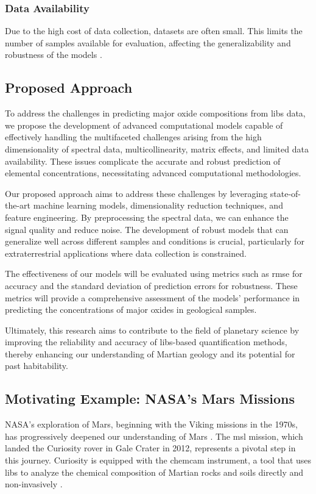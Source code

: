 \subsubsection{Data Availability}
Due to the high cost of data collection, datasets are often small. This limits the number of samples available for evaluation, affecting the generalizability and robustness of the models \cite{p9_paper}.

\subsection{Proposed Approach}
To address the challenges in predicting major oxide compositions from \gls{libs} data, we propose the development of advanced computational models capable of effectively handling the multifaceted challenges arising from the high dimensionality of spectral data, multicollinearity, matrix effects, and limited data availability.
These issues complicate the accurate and robust prediction of elemental concentrations, necessitating advanced computational methodologies. 

Our proposed approach aims to address these challenges by leveraging state-of-the-art machine learning models, dimensionality reduction techniques, and feature engineering.
By preprocessing the spectral data, we can enhance the signal quality and reduce noise.
The development of robust models that can generalize well across different samples and conditions is crucial, particularly for extraterrestrial applications where data collection is constrained.

The effectiveness of our models will be evaluated using metrics such as \gls{rmse} for accuracy and the standard deviation of prediction errors for robustness.
These metrics will provide a comprehensive assessment of the models' performance in predicting the concentrations of major oxides in geological samples.

Ultimately, this research aims to contribute to the field of planetary science by improving the reliability and accuracy of \gls{libs}-based quantification methods, thereby enhancing our understanding of Martian geology and its potential for past habitability.

\subsection{Motivating Example: NASA's Mars Missions}
NASA's exploration of Mars, beginning with the Viking missions in the 1970s, has progressively deepened our understanding of Mars \cite{marsnasagov_vikings}.
The \gls{msl} mission, which landed the Curiosity rover in Gale Crater in 2012, represents a pivotal step in this journey.
Curiosity is equipped with the \gls{chemcam} instrument, a tool that uses \gls{libs} to analyze the chemical composition of Martian rocks and soils directly and non-invasively \cite{chemcamNasaWebsite}.


